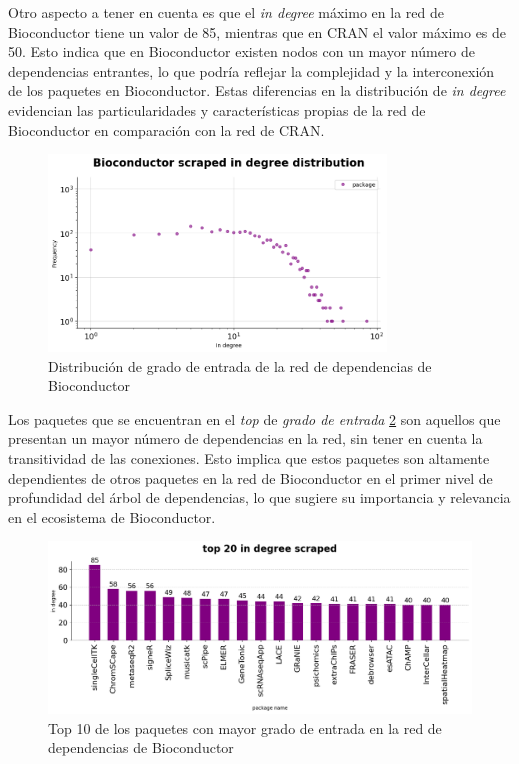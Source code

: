Otro aspecto a tener en cuenta es que el \emph{in degree} máximo en la red de Bioconductor tiene un
valor de 85, mientras que en CRAN el valor máximo es de 50. Esto indica que en Bioconductor existen
nodos con un mayor número de dependencias entrantes, lo que podría reflejar la complejidad y la
interconexión de los paquetes en Bioconductor. Estas diferencias en la distribución de \emph{in degree}
evidencian las particularidades y características propias de la red de Bioconductor en comparación con
la red de CRAN.

\begin{figure}[ht!]
    \begin{center}
        \includegraphics[width=0.8\textwidth]{img/bioconductor/in_degree_dist.png}
        \caption{Distribución de grado de entrada de la red de dependencias de Bioconductor}
        \label{fig:bioconductor_in_degree_dist}
    \end{center}
\end{figure}

Los paquetes que se encuentran en el \emph{top} de \emph{grado de entrada} \ref{fig:bioconductor_in_degree} son aquellos que presentan
un mayor número de dependencias en la red, sin tener en cuenta la transitividad de las conexiones.
Esto implica que estos paquetes son altamente dependientes de otros paquetes en la red de Bioconductor en el primer nivel de
profundidad del árbol de dependencias, lo que sugiere su importancia y relevancia en el ecosistema de Bioconductor.

\begin{figure}[ht!]
    \begin{center}
        \includegraphics[width=1\textwidth]{img/bioconductor/top_in_degree.png}
        \caption{Top 10 de los paquetes con mayor grado de entrada en la red de dependencias de Bioconductor}
        \label{fig:bioconductor_in_degree}
    \end{center}
\end{figure}

